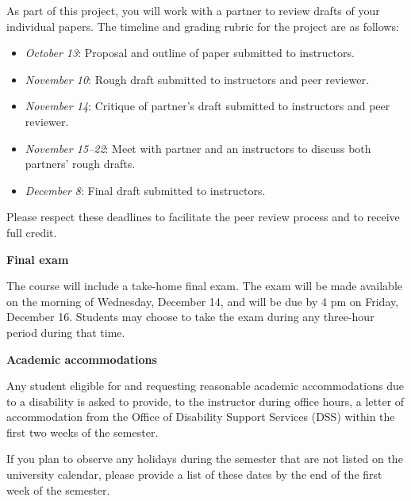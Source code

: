 \documentclass[11pt]{article}
\begin{document}
As part of this project, you will work with a partner to review drafts of your individual papers.  The timeline and grading rubric for the project are as follows:
\begin{itemize}[topsep=0pt,itemsep=-3pt]
\item \emph{October 13}: Proposal and outline of paper submitted to instructors. 
\item \emph{November 10}: Rough draft submitted to instructors and peer reviewer. 
\item \emph{November 14}: Critique of partner's draft submitted to instructors and peer reviewer. 
\item \emph{November 15--22}: Meet with partner and an instructors to discuss both partners' rough drafts. 
\item \emph{December 8}: Final draft submitted to instructors. 
\end{itemize}
Please respect these deadlines to facilitate the peer review process and to receive full credit.

\medskip

{\bf Final exam}

The course will include a take-home final exam.  The exam will be made available on the morning of Wednesday, December 14, and will be due by 4 pm on Friday, December 16.  Students may choose to take the exam during any three-hour period during that time.

\medskip

{\bf Academic accommodations}

Any student eligible for and requesting reasonable academic accommodations due to a disability is asked to provide, to the instructor during office hours, a letter of accommodation from the Office of Disability Support Services (DSS) within the first two weeks of the semester.

If you plan to observe any holidays during the semester that are not listed on the university calendar, please provide a list of these dates by the end of the first week of the semester.
\end{document}
